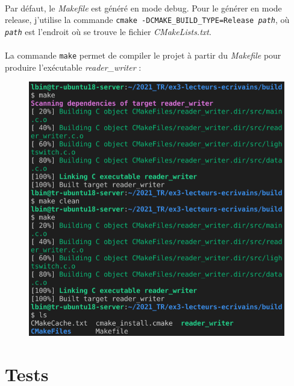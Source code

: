 \documentclass{article}
\begin{document}
    \paragraph{}
    Par défaut, le \emph{Makefile} est généré en mode debug. Pour le générer en mode release, j'utilise la commande \texttt{cmake -DCMAKE\_BUILD\_TYPE=Release \emph{path}}, où \texttt{\emph{path}} est l'endroit où se trouve le fichier \emph{CMakeLists.txt}.
    
    \newpage
    \paragraph{}
    La commande \texttt{make} permet de compiler le projet à partir du \emph{Makefile} pour produire l'exécutable \emph{reader\_writer} :
    \begin{figure}[H]
        \centering
        \includegraphics[width=.65\textwidth]{./screenshots/make.png}
    \end{figure}

    \newpage
    \section{Tests}
\end{document}
